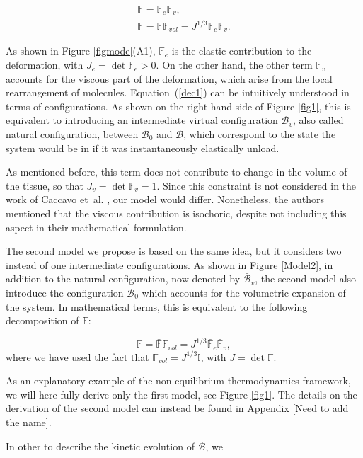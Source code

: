 \documentclass[runningheads]{llncs}
\newcommand{\F}{\ensuremath{\mathbb{F}}}
\begin{document}
\begin{gather}
\F=\F_e\F_v,\label{dec1}\tag{A}\\
\F= \bar{\F} \F_{vol}= J^{1/3} \bar{\F}_e \bar{\F}_v.\tag{B}
\end{gather}

As shown in Figure \ref{figmode}(A1), $\F_e$ is the elastic contribution to the deformation, with $J_e=\det \F_e>0$. On the other hand, the other term $\F_v$ accounts for the viscous part of the deformation, which arise from the local rearrangement of molecules. Equation~(\ref{dec1}) can be intuitively understood in terms of configurations. As shown on the right hand side of Figure \ref{fig1}, this is equivalent to introducing an intermediate virtual configuration $\mathcal{B}_v$, also called natural configuration, between $\mathcal{B}_0$ and $\mathcal{B}$, which correspond to the state the system would be in if it was instantaneously elastically unload. 

As mentioned before, this term does not contribute to change in the volume of the tissue, so that $J_v=\det \F_v= 1$. Since this constraint is not considered in the work of Caccavo et~al. \cite{Article1,CACCAVO2}, our model would differ. Nonetheless, the authors mentioned that the viscous contribution is isochoric, despite not including this aspect in their mathematical formulation. 

The second model we propose is based on the same idea, but it considers two instead of one intermediate configurations. As shown in Figure \ref{Model2}, in addition to the natural configuration, now denoted by $\bar{\mathcal{B}}_v$, the second model also introduce the configuration $\bar{\mathcal{B}}_0$ which accounts for the volumetric expansion of the system. In mathematical terms, this is equivalent to the following decomposition of $\F$:

\begin{equation}
\F= \bar{\F} \F_{vol}= J^{1/3} \bar{\F}_e \bar{\F}_v,
\end{equation}
where we have used the fact that $\F_{vol}=J^{1/3}\mathbb{I}$, with $J=\det \F$. 


As an explanatory example of the non-equilibrium thermodynamics framework, we will here fully derive only the first model, see Figure \ref{fig1}. The details on the derivation of the second model can instead be found in Appendix [Need to add the name]. 

In other to describe the kinetic evolution of $\mathcal{B}$, we 
 
\end{document}
